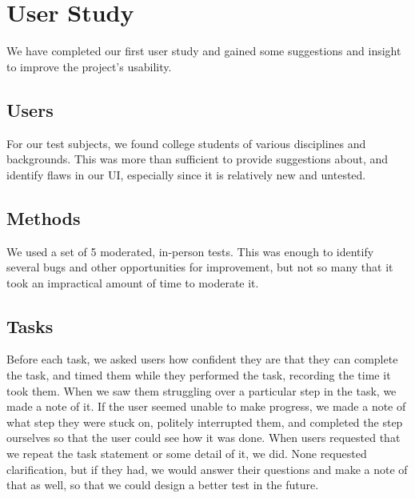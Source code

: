 \documentclass[letterpaper,10pt, onecolumn, draftclsnofoot]{IEEEtran}
\begin{document}
\section{User Study}

We have completed our first user study and gained some suggestions and insight to improve the project's usability. 

\subsection{Users}

For our test subjects, we found college students of various disciplines and backgrounds. This was more than sufficient to provide suggestions about, and identify flaws in our UI, especially since it is relatively new and untested.

\subsection{Methods}

We used a set of 5 moderated, in-person tests. This was enough to identify several bugs and other opportunities for improvement, but not so many that it took an impractical amount of time to moderate it.

\subsection{Tasks}

Before each task, we asked users how confident they are that they can complete the task, and timed them while they performed the task, recording the time it took them. When we saw them struggling over a particular step in the task, we made a note of it. If the user seemed unable to make progress, we made a note of what step they were stuck on, politely interrupted them, and completed the step ourselves so that the user could see how it was done. When users requested that we repeat the task statement or some detail of it, we did. None requested clarification, but if they had, we would answer their questions and make a note of that as well, so that we could design a better test in the future.
\end{document}
